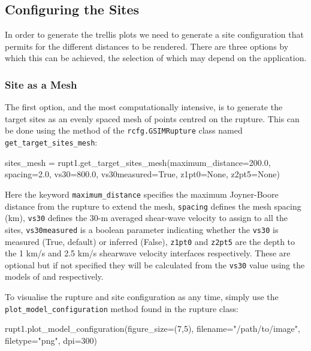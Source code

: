 \subsection{Configuring the Sites}

In order to generate the trellis plots we need to generate a site configuration that permits for the different distances to be rendered. There are three options by which this can be achieved, the selection of which may depend on the application.

\subsubsection{Site as a Mesh}

The first option, and the most computationally intensive, is to generate the target sites as an evenly spaced mesh of points centred on the rupture. This can be done using the method of the \verb=rcfg.GSIMRupture= class named \verb=get_target_sites_mesh=:

\begin{python}
sites_mesh = rupt1.get_target_sites_mesh(maximum_distance=200.0,
                                         spacing=2.0,
                                         vs30=800.0,
                                         vs30measured=True,
                                         z1pt0=None,
                                         z2pt5=None)
\end{python}

Here the keyword \verb=maximum_distance= specifies the maximum Joyner-Boore distance from the rupture to extend the mesh, \verb=spacing= defines the mesh spacing (km), \verb=vs30= defines the 30-m averaged shear-wave velocity to assign to all the sites, \verb=vs30measured= is a boolean parameter indicating whether the \verb=vs30= is measured (True, default) or inferred (False), \verb=z1pt0= and \verb=z2pt5= are the depth to the 1 km/s and 2.5 km/s shearwave velocity interfaces respectively. These are optional but if not specified they will be calculated from the \verb=vs30= value using the models of \textcite{AbrahamsonSilva2008} and \textcite{CampbellBozorgnia2008} respectively. 

To visualise the rupture and site configuration as any time, simply use the \\ \verb=plot_model_configuration= method found in the rupture class:

\begin{python}
rupt1.plot_model_configuration(figure_size=(7,5),
                               filename="/path/to/image",
                               filetype="png",
                               dpi=300)
\end{python}

